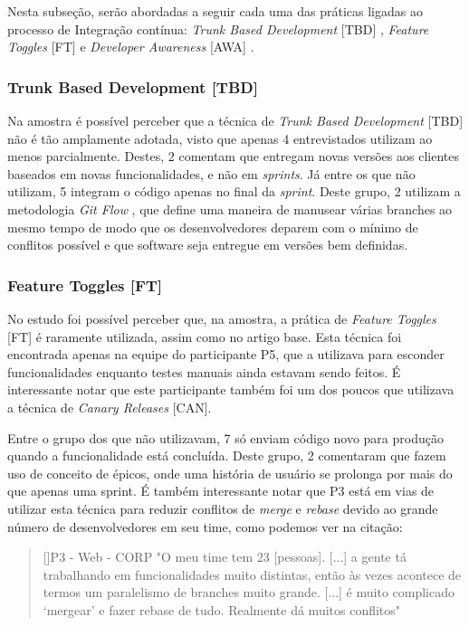 Nesta subseção, serão abordadas a seguir cada uma das práticas ligadas ao processo de Integração contínua: \emph{Trunk Based Development} [TBD] \cite{devAndDeploymentFB}, \emph{Feature Toggles} [FT] \cite{featureToggles} e \emph{Developer Awareness} [AWA] .


\subsubsection{Trunk Based Development [TBD]}
Na amostra é possível perceber que a técnica de \emph{Trunk Based Development} [TBD] não é tão amplamente adotada, visto que apenas 4 entrevistados utilizam ao menos parcialmente. Destes, 2 comentam que entregam novas versões aos clientes baseados em novas funcionalidades, e não em \emph{sprints}. Já entre os que não utilizam, 5 integram o código apenas no final da \emph{sprint}. Deste grupo, 2 utilizam a metodologia \emph{Git Flow} \cite{gitFlow}, que define uma maneira de manusear várias branches ao mesmo tempo de modo que os desenvolvedores deparem com o mínimo de conflitos possível e que software seja entregue em versões bem definidas.

\subsubsection{Feature Toggles [FT]}

No estudo foi possível perceber que, na amostra, a prática de \emph{Feature Toggles} [FT] é raramente utilizada, assim como no artigo base. Esta técnica foi encontrada apenas na equipe do participante P5, que a utilizava para esconder funcionalidades enquanto testes manuais ainda estavam sendo feitos. É interessante notar que este participante também foi um dos poucos que utilizava a técnica de \emph{Canary Releases} [CAN].

Entre o grupo dos que não utilizavam, 7 só enviam código novo para produção quando a funcionalidade está concluída. Deste grupo, 2 comentaram que fazem uso de conceito de épicos, onde uma história de usuário se prolonga por mais do que apenas uma sprint. É também interessante notar que P3 está em vias de utilizar esta técnica para reduzir conflitos de \emph{merge} e \emph{rebase} devido ao grande número de desenvolvedores em seu time, como podemos ver na citação:

\begin{quotation}[]{P3 - Web - CORP}
    "O meu time tem 23 [pessoas]. [...] a gente tá trabalhando em funcionalidades muito distintas, então às vezes acontece de termos um paralelismo de branches muito grande. [...] é muito complicado ‘mergear’ e fazer rebase de tudo. Realmente dá muitos conflitos"
\end{quotation}


